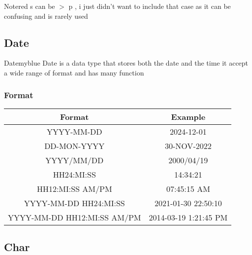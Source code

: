 \begin{prettyBox}{Note}{red}
s can be \(>\) p , i just didn't want to include that case as it can be confusing and is rarely used
\end{prettyBox}


\vspace{0.5cm}

\subsection{Date}
\begin{prettyBox}{Date}{myblue}
Date is a data type that stores both the date and the time it accept a wide range of format
and has many function  
\end{prettyBox}

\vspace{0.25cm}

\subsubsection{Format}

\vspace{0.25cm}
\begin{center}
 \renewcommand{\arraystretch}{1.5}
    \begin{tabular}{|c|c|}
        \hline
        Format & Example\\
        \hline
        YYYY-MM-DD & 2024-12-01 \\
        \hline
        DD-MON-YYYY & 30-NOV-2022\\
        \hline
        YYYY/MM/DD & 2000/04/19\\
        \hline
        HH24:MI:SS & 14:34:21\\
        \hline
        HH12:MI:SS AM/PM & 07:45:15 AM\\
        \hline
        YYYY-MM-DD HH24:MI:SS & 2021-01-30 22:50:10\\
        \hline 
        YYYY-MM-DD HH12:MI:SS AM/PM & 2014-03-19 1:21:45 PM\\
        \hline
    \end{tabular}
\end{center}



\vspace{0.5cm}
\subsection{Char}


